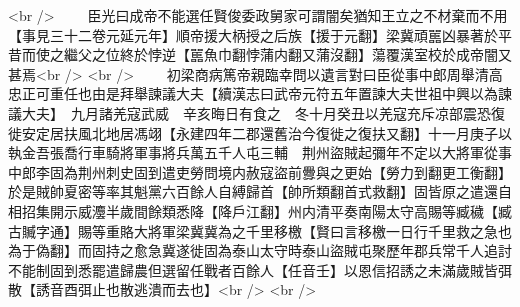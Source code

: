 <br />
　　臣光曰成帝不能選任賢俊委政舅家可謂闇矣猶知王立之不材棄而不用【事見三十二卷元延元年】順帝援大柄授之后族【援于元翻】梁冀頑嚚凶暴著於平昔而使之繼父之位終於悖逆【嚚魚巾翻悖蒲内翻又蒲沒翻】蕩覆漢室校於成帝闇又甚焉<br />
<br />
　　初梁商病篤帝親臨幸問以遺言對曰臣從事中郎周舉清高忠正可重任也由是拜舉諫議大夫【續漢志曰武帝元符五年置諫大夫世祖中興以為諫議大夫】　九月諸羌寇武威　辛亥晦日有食之　冬十月癸丑以羌寇充斥凉部震恐復徙安定居扶風北地居馮翊【永建四年二郡還舊治今復徙之復扶又翻】十一月庚子以執金吾張喬行車騎將軍事將兵萬五千人屯三輔　荆州盜賊起彌年不定以大將軍從事中郎李固為荆州刺史固到遣吏勞問境内赦寇盜前釁與之更始【勞力到翻更工衡翻】於是賊帥夏密等率其魁黨六百餘人自縛歸首【帥所類翻首式救翻】固皆原之遣還自相招集開示威灋半歲間餘類悉降【降戶江翻】州内清平奏南陽太守高賜等臧穢【臧古贓字通】賜等重賂大將軍梁冀冀為之千里移檄【賢曰言移檄一日行千里救之急也為于偽翻】而固持之愈急冀遂徙固為泰山太守時泰山盜賊屯聚歷年郡兵常千人追討不能制固到悉罷遣歸農但選留任戰者百餘人【任音壬】以恩信招誘之未滿歲賊皆弭散【誘音酉弭止也散逃潰而去也】<br />
<br />
